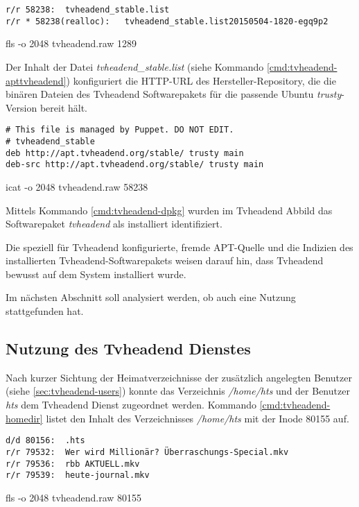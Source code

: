 \begin{cmd}[H]
\begin{verbatim}
r/r 58238:	tvheadend_stable.list
r/r * 58238(realloc):	tvheadend_stable.list20150504-1820-egq9p2
\end{verbatim}
\caption{fls -o 2048 tvheadend.raw 1289}
\label{cmd:tvheadend-aptdir}
\end{cmd}

Der Inhalt der Datei \textit{tvheadend\_stable.list} (siehe Kommando \autoref{cmd:tvheadend-apttvheadend}) konfiguriert die HTTP-URL des Hersteller-Repository, die die binären Dateien des Tvheadend Softwarepakets für die passende Ubuntu \textit{trusty}-Version bereit hält.

\begin{cmd}[H]
\begin{verbatim}
# This file is managed by Puppet. DO NOT EDIT.
# tvheadend_stable
deb http://apt.tvheadend.org/stable/ trusty main
deb-src http://apt.tvheadend.org/stable/ trusty main
\end{verbatim}
\caption{icat -o 2048 tvheadend.raw 58238}
\label{cmd:tvheadend-apttvheadend}
\end{cmd}

Mittels Kommando \autoref{cmd:tvheadend-dpkg} wurden im Tvheadend Abbild das Softwarepaket \textit{tvheadend} als installiert identifiziert.

Die speziell für Tvheadend konfigurierte, fremde APT-Quelle und die Indizien des installierten Tvheadend-Softwarepakets weisen darauf hin, dass Tvheadend bewusst auf dem System installiert wurde. 

Im nächsten Abschnitt soll analysiert werden, ob auch eine Nutzung stattgefunden hat.

\subsection{Nutzung des Tvheadend Dienstes}

Nach kurzer Sichtung der Heimatverzeichnisse der zusätzlich angelegten Benutzer (siehe \autoref{sec:tvheadend-users}) konnte das Verzeichnis \textit{/home/hts} und der Benutzer \textit{hts} dem Tvheadend Dienst zugeordnet werden. Kommando \autoref{cmd:tvheadend-homedir} listet den Inhalt des Verzeichnisses \textit{/home/hts} mit der Inode 80155 auf.

\begin{cmd}[H]
\begin{verbatim}
d/d 80156:	.hts
r/r 79532:	Wer wird Millionär? Überraschungs-Special.mkv
r/r 79536:	rbb AKTUELL.mkv
r/r 79539:	heute-journal.mkv
\end{verbatim}
\caption{fls -o 2048 tvheadend.raw 80155}
\label{cmd:tvheadend-homedir}
\end{cmd}

